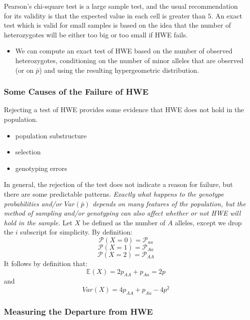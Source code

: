 \documentclass[a4paper,twoside,11pt]{article}
\begin{document}
\newline
\newline
Pearson’s chi-square test is a \textcolor{NavyBlue}{large sample test}, and the usual recommendation for its validity is that the expected value in each cell is greater than $5$.
\newline
\newline
An exact test which is valid for \textcolor{NavyBlue}{small samples} is based on the idea that the number of heterozygotes will be either too big or too small if HWE fails.
\begin{itemize}
    \item We can compute an exact test of HWE based on the number of observed heterozygotes, conditioning on the number of minor alleles that are observed (or on $\bar{p}$) and using the resulting hypergeometric distribution.
\end{itemize}
\subsubsection{Some Causes of the Failure of HWE}
Rejecting a test of HWE provides some evidence that HWE does not hold in the population. 
\begin{itemize}
    \item population substructure
    \item selection 
    \item genotyping errors
\end{itemize}
In general, the rejection of the test does not indicate a reason for failure, but there are some predictable patterns. 
\newline
\newline
\textcolor{NavyBlue}{\textit{Exactly what happens to the genotype probabilities and/or $Var(\bar{p})$ depends on many features of the population, but the method of sampling and/or genotyping can also affect whether or not HWE will hold in the sample.}}
\newline
\newline
Let $X$ be defined as the number of $A$ alleles, except we drop the $i$ subscript for simplicity. By definition:
$$
\mathcal{P}(X=0) = \mathcal{P}_{aa}
$$
$$
\mathcal{P}(X=1) = \mathcal{P}_{Aa}
$$
$$
\mathcal{P}(X=2) = \mathcal{P}_{AA}
$$
It follows by definition that:
$$
\mathbb{E}(X) = 2 p_{AA} + p_{Aa} = 2p
$$
and
$$
Var(X) = 4p_{AA} + p_{Aa} - 4p^2
$$

\subsubsection{Measuring the Departure from HWE}
\end{document}
